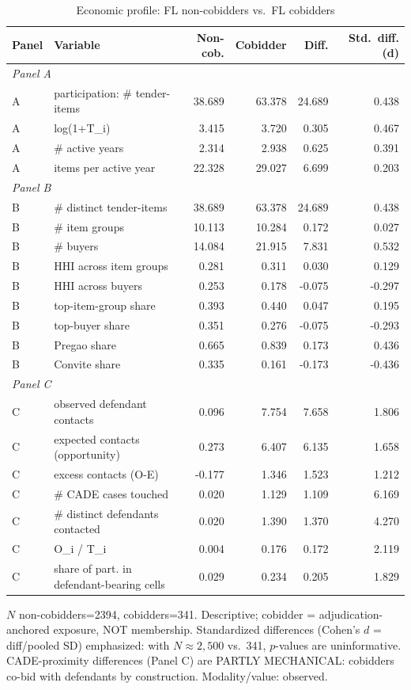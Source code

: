 \begin{table}[htbp]\centering\footnotesize
\caption{Economic profile: FL non-cobidders vs.\ FL cobidders}
\label{tab:economic_profile}
\begin{tabular}{llrrrr}\hline
Panel & Variable & Non-cob. & Cobidder & Diff. & Std.\ diff. (d) \\\hline
\multicolumn{6}{l}{\textit{Panel A}} \\
A & participation: # tender-items & 38.689 & 63.378 & 24.689 & 0.438 \\
A & log(1+T\_i) & 3.415 & 3.720 & 0.305 & 0.467 \\
A & # active years & 2.314 & 2.938 & 0.625 & 0.391 \\
A & items per active year & 22.328 & 29.027 & 6.699 & 0.203 \\
\multicolumn{6}{l}{\textit{Panel B}} \\
B & # distinct tender-items & 38.689 & 63.378 & 24.689 & 0.438 \\
B & # item groups & 10.113 & 10.284 & 0.172 & 0.027 \\
B & # buyers & 14.084 & 21.915 & 7.831 & 0.532 \\
B & HHI across item groups & 0.281 & 0.311 & 0.030 & 0.129 \\
B & HHI across buyers & 0.253 & 0.178 & -0.075 & -0.297 \\
B & top-item-group share & 0.393 & 0.440 & 0.047 & 0.195 \\
B & top-buyer share & 0.351 & 0.276 & -0.075 & -0.293 \\
B & Pregao share & 0.665 & 0.839 & 0.173 & 0.436 \\
B & Convite share & 0.335 & 0.161 & -0.173 & -0.436 \\
\multicolumn{6}{l}{\textit{Panel C}} \\
C & observed defendant contacts & 0.096 & 7.754 & 7.658 & 1.806 \\
C & expected contacts (opportunity) & 0.273 & 6.407 & 6.135 & 1.658 \\
C & excess contacts (O-E) & -0.177 & 1.346 & 1.523 & 1.212 \\
C & # CADE cases touched & 0.020 & 1.129 & 1.109 & 6.169 \\
C & # distinct defendants contacted & 0.020 & 1.390 & 1.370 & 4.270 \\
C & O\_i / T\_i & 0.004 & 0.176 & 0.172 & 2.119 \\
C & share of part. in defendant-bearing cells & 0.029 & 0.234 & 0.205 & 1.829 \\
\hline\end{tabular}
\begin{tablenotes}\footnotesize\item $N$ non-cobidders=2394, cobidders=341. Descriptive; cobidder = adjudication-anchored exposure, NOT membership. Standardized differences (Cohen's $d$ = diff/pooled SD) emphasized: with $N\!\approx\!2{,}500$ vs.\ 341, $p$-values are uninformative. CADE-proximity differences (Panel C) are PARTLY MECHANICAL: cobidders co-bid with defendants by construction. Modality/value: observed.\end{tablenotes}
\end{table}
